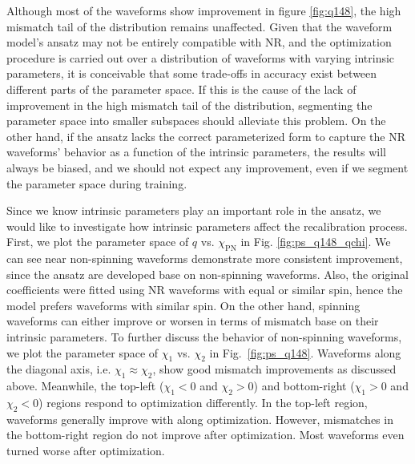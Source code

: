 \documentclass[twocolumn]{aastex631}
\begin{document}
Although most of the waveforms show improvement in figure \ref{fig:q148}, the
high mismatch tail of the distribution remains unaffected. Given that the
waveform model's ansatz may not be entirely compatible with NR, and the
optimization procedure is carried out over a distribution of waveforms with
varying intrinsic parameters, it is conceivable that some trade-offs in accuracy
exist between different parts of the parameter space. If this is the cause of
the lack of improvement in the high mismatch tail of the distribution,
segmenting the parameter space into smaller subspaces should alleviate this
problem. On the other hand, if the ansatz lacks the correct parameterized form
to capture the NR waveforms' behavior as a function of the intrinsic parameters,
the results will always be biased, and we should not expect any improvement,
even if we segment the parameter space during training.

Since we know intrinsic parameters play an important role in the ansatz, we
would like to investigate how intrinsic parameters affect the recalibration
process. First, we plot the parameter space of $q$ vs. $\chi_{\mathrm{PN}}$ in
Fig. \ref{fig:ps_q148_qchi}. We can see near non-spinning waveforms demonstrate
more consistent improvement, since the ansatz are developed base on non-spinning 
waveforms. Also, the original coefficients were fitted using NR waveforms with
equal or similar spin, hence the model prefers waveforms with similar spin. On 
the other hand, spinning waveforms can either improve or worsen in terms of 
mismatch base on their intrinsic parameters. To further discuss the behavior of 
non-spinning waveforms, we plot the parameter space of $\chi_1$ vs. $\chi_2$ in
Fig.~\ref{fig:ps_q148}. Waveforms along the diagonal axis, i.e. 
$\chi_1\approx\chi_2$, show good mismatch improvements as discussed above. 
Meanwhile, the top-left ($\chi_1<0$ and $\chi_2>0$) and bottom-right ($\chi_1>0$ 
and $\chi_2<0$) regions respond to optimization differently. In the top-left region, waveforms
generally improve with along optimization. However, mismatches in the bottom-right 
region do not improve after optimization. Most waveforms even turned worse after 
optimization. 
\end{document}
